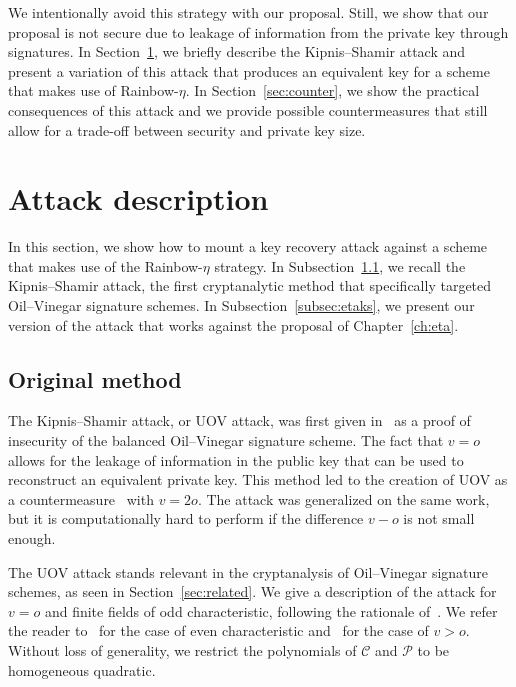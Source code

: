 \documentclass[12pt, a4paper, oneside]{memoir}
\theoremstyle{definition}
\begin{document}
We intentionally avoid this strategy with our proposal. Still, we show that our proposal is not secure due to leakage of information from the private key through signatures. In Section~\ref{sec:atdesc}, we briefly describe the Kipnis--Shamir attack and present a variation of this attack that produces an equivalent key for a scheme that makes use of Rainbow-$\eta$. In Section~\ref{sec:counter}, we show the practical consequences of this attack and we provide possible countermeasures that still allow for a trade-off between security and private key size.

\section{Attack description}\label{sec:atdesc}

In this section, we show how to mount a key recovery attack against a scheme that makes use of the Rainbow-$\eta$ strategy. In Subsection~\ref{subsec:ks}, we recall the Kipnis--Shamir attack, the first cryptanalytic method that specifically targeted Oil--Vinegar signature schemes. In Subsection~\ref{subsec:etaks}, we present our version of the attack that works against the proposal of Chapter~\ref{ch:eta}.

\subsection{Original method}\label{subsec:ks}

The Kipnis--Shamir attack, or UOV attack, was first given in~\cite{Kipnis:199808} as a proof of insecurity of the balanced Oil--Vinegar signature scheme. The fact that $v = o$ allows for the leakage of information in the public key that can be used to reconstruct an equivalent private key. This method led to the creation of UOV as a countermeasure~\cite{Kipnis:199904} with $v = 2o$. The attack was generalized on the same work, but it is computationally hard to perform if the difference $v - o$ is not small enough. 

The UOV attack stands relevant in the cryptanalysis of Oil--Vinegar signature schemes, as seen in Section~\ref{sec:related}. We give a description of the attack for $v = o$ and finite fields of odd characteristic, following the rationale of~\cite[Sec.~3.2]{Ding:2006}. We refer the reader to~\cite{Cao:201105} for the case of even characteristic and~\cite{Kipnis:199904} for the case of $v > o$. Without loss of generality, we restrict the polynomials of $\mathcal{C}$ and $\mathcal{P}$ to be homogeneous quadratic.
\end{document}
